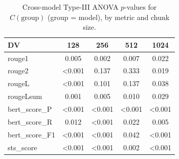 \begin{table}[H]
\centering
\caption{Cross-model Type-III ANOVA $p$-values for $C(\mathrm{group})$ (group = model), by metric and chunk size.}
\label{tab:cross-anova-pvalues}
\small
\begin{tabular}{lcccc}
\toprule
DV & 128 & 256 & 512 & 1024 \\
\midrule
rouge1 & 0.005 & 0.002 & 0.007 & 0.022 \\
rouge2 & <0.001 & 0.137 & 0.333 & 0.019 \\
rougeL & <0.001 & 0.101 & 0.137 & 0.038 \\
rougeLsum & 0.001 & 0.005 & 0.010 & 0.029 \\
bert\_score\_P & <0.001 & <0.001 & <0.001 & <0.001 \\
bert\_score\_R & 0.012 & <0.001 & 0.022 & 0.005 \\
bert\_score\_F1 & <0.001 & <0.001 & 0.042 & <0.001 \\
sts\_score & <0.001 & <0.001 & 0.002 & <0.001 \\
\bottomrule
\end{tabular}
\end{table}

